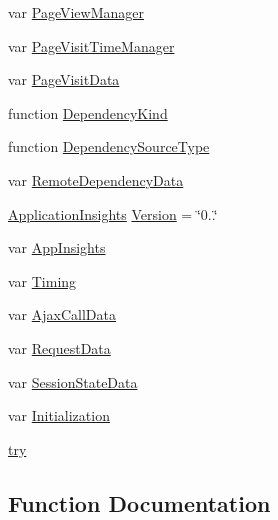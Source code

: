 \begin{DoxyCompactItemize}
var \hyperlink{_scripts_2ai_80_822_89-build00167_8js_a1953356b8d75c486cf82acbd85c5cc9e}{Page\+View\+Manager}
\item 
var \hyperlink{_scripts_2ai_80_822_89-build00167_8js_ab8b4e4ccac1decfe8615e90f908ed5ed}{Page\+Visit\+Time\+Manager}
\item 
var \hyperlink{_scripts_2ai_80_822_89-build00167_8js_aebc84d0ba279b4ed22995e577f2cdfd2}{Page\+Visit\+Data}
\item 
function \hyperlink{_scripts_2ai_80_822_89-build00167_8js_a42b5eb4744f3a19ea507f3e7b74a808b}{Dependency\+Kind}
\item 
function \hyperlink{_scripts_2ai_80_822_89-build00167_8js_a8f44f92d20d4040180c49d805388de55}{Dependency\+Source\+Type}
\item 
var \hyperlink{_scripts_2ai_80_822_89-build00167_8js_ae73ab0e6f2105faf2ae368cf86385a16}{Remote\+Dependency\+Data}
\item 
\hyperlink{_scripts_2ai_80_822_89-build00167_8js_aa415ef4f8cdd699689ef4b61db7656d8}{Application\+Insights} \hyperlink{_scripts_2ai_80_822_89-build00167_8js_a63eb1f8235088b82a68745786527b11b}{Version} = \char`\"{}0..\char`\"{}
\item 
var \hyperlink{_scripts_2ai_80_822_89-build00167_8js_a991a37a9fbd0b268560e6c895644a9dd}{App\+Insights}
\item 
var \hyperlink{_scripts_2ai_80_822_89-build00167_8js_afdd3ea2c773e0e94771da9013e155095}{Timing}
\item 
var \hyperlink{_scripts_2ai_80_822_89-build00167_8js_a85c6bfff3874043e13f9f194f56a9498}{Ajax\+Call\+Data}
\item 
var \hyperlink{_scripts_2ai_80_822_89-build00167_8js_a569c37beac3dbefbabc9e6f28ebfb9cf}{Request\+Data}
\item 
var \hyperlink{_scripts_2ai_80_822_89-build00167_8js_a86a73a610a18604fe044cbce60ed32e8}{Session\+State\+Data}
\item 
var \hyperlink{_scripts_2ai_80_822_89-build00167_8js_a473a131d7d47a72b276d14940737022a}{Initialization}
\item 
\hyperlink{_scripts_2ai_80_822_89-build00167_8js_abe4cc9788f52e49485473dc699537388}{try}
\end{DoxyCompactItemize}


\subsection{Function Documentation}
